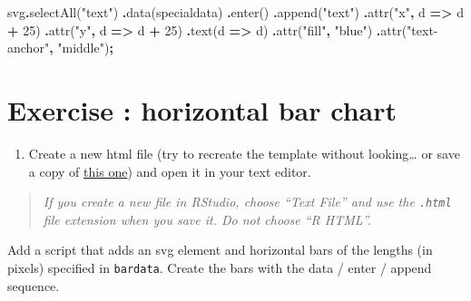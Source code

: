 \documentclass[
  openany]{book}
\newenvironment{Shaded}{\begin{snugshade}}{\end{snugshade}}
\newcommand{\DecValTok}[1]{\textcolor[rgb]{0.00,0.00,0.81}{#1}}
\newcommand{\FunctionTok}[1]{\textcolor[rgb]{0.00,0.00,0.00}{#1}}
\newcommand{\KeywordTok}[1]{\textcolor[rgb]{0.13,0.29,0.53}{\textbf{#1}}}
\newcommand{\NormalTok}[1]{#1}
\newcommand{\OperatorTok}[1]{\textcolor[rgb]{0.81,0.36,0.00}{\textbf{#1}}}
\newcommand{\StringTok}[1]{\textcolor[rgb]{0.31,0.60,0.02}{#1}}
\providecommand{\tightlist}{%
  \setlength{\itemsep}{0pt}\setlength{\parskip}{0pt}}
\begin{document}
\begin{Shaded}
\begin{Highlighting}[]
\NormalTok{  svg}\OperatorTok{.}\FunctionTok{selectAll}\NormalTok{(}\StringTok{"text"}\NormalTok{)}
      \OperatorTok{.}\FunctionTok{data}\NormalTok{(specialdata)}
      \OperatorTok{.}\FunctionTok{enter}\NormalTok{()}
      \OperatorTok{.}\FunctionTok{append}\NormalTok{(}\StringTok{"text"}\NormalTok{)}
      \OperatorTok{.}\FunctionTok{attr}\NormalTok{(}\StringTok{"x"}\OperatorTok{,}\NormalTok{ d }\KeywordTok{=\textgreater{}}\NormalTok{ d }\OperatorTok{+} \DecValTok{25}\NormalTok{)}
      \OperatorTok{.}\FunctionTok{attr}\NormalTok{(}\StringTok{"y"}\OperatorTok{,}\NormalTok{ d }\KeywordTok{=\textgreater{}}\NormalTok{ d }\OperatorTok{+} \DecValTok{25}\NormalTok{)}
      \OperatorTok{.}\FunctionTok{text}\NormalTok{(d }\KeywordTok{=\textgreater{}}\NormalTok{ d)}
      \OperatorTok{.}\FunctionTok{attr}\NormalTok{(}\StringTok{"fill"}\OperatorTok{,} \StringTok{"blue"}\NormalTok{)}
      \OperatorTok{.}\FunctionTok{attr}\NormalTok{(}\StringTok{"text{-}anchor"}\OperatorTok{,} \StringTok{"middle"}\NormalTok{)}\OperatorTok{;}
\end{Highlighting}
\end{Shaded}

\hypertarget{exercise-horizontal-bar-chart}{%
\section{Exercise : horizontal bar chart}\label{exercise-horizontal-bar-chart}}

\begin{enumerate}
\def\labelenumi{\arabic{enumi}.}
\tightlist
\item
  Create a new html file (try to recreate the template without looking\ldots{} or save a copy of \href{https://raw.githubusercontent.com/jtr13/d3book/master/code/d3template.html}{this one}) and open it in your text editor.
\end{enumerate}

\begin{quote}
\emph{If you create a new file in RStudio, choose ``Text File'' and use the \texttt{.html} file extension when you save it. Do not choose ``R HTML''.}
\end{quote}

Add a script that adds an svg element and horizontal bars of the lengths (in pixels) specified in \texttt{bardata}. Create the bars with the data / enter / append sequence.
\end{document}
